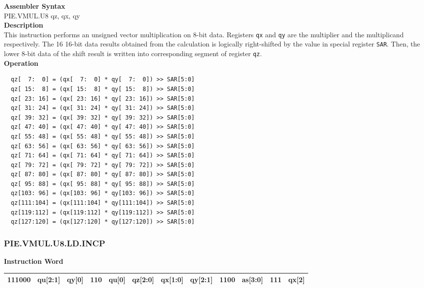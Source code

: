 \textbf{Assembler Syntax} \\
PIE.VMUL.U8 qz, qx, qy \\
\textbf{Description} \\
This instruction performs an unsigned vector multiplication on 8-bit data. Registers \lstinline{qx} and \lstinline{qy} are the multiplier and the multiplicand respectively. The 16 16-bit data results obtained from the calculation is logically right-shifted by the value in special register \lstinline{SAR}. Then, the lower 8-bit data of the shift result is written into corresponding segment of register \lstinline{qz}.\\
\textbf{Operation}
\begin{lstlisting}
  qz[  7:  0] = (qx[  7:  0] * qy[  7:  0]) >> SAR[5:0]
  qz[ 15:  8] = (qx[ 15:  8] * qy[ 15:  8]) >> SAR[5:0]
  qz[ 23: 16] = (qx[ 23: 16] * qy[ 23: 16]) >> SAR[5:0]
  qz[ 31: 24] = (qx[ 31: 24] * qy[ 31: 24]) >> SAR[5:0]
  qz[ 39: 32] = (qx[ 39: 32] * qy[ 39: 32]) >> SAR[5:0]
  qz[ 47: 40] = (qx[ 47: 40] * qy[ 47: 40]) >> SAR[5:0]
  qz[ 55: 48] = (qx[ 55: 48] * qy[ 55: 48]) >> SAR[5:0]
  qz[ 63: 56] = (qx[ 63: 56] * qy[ 63: 56]) >> SAR[5:0]
  qz[ 71: 64] = (qx[ 71: 64] * qy[ 71: 64]) >> SAR[5:0]
  qz[ 79: 72] = (qx[ 79: 72] * qy[ 79: 72]) >> SAR[5:0]
  qz[ 87: 80] = (qx[ 87: 80] * qy[ 87: 80]) >> SAR[5:0]
  qz[ 95: 88] = (qx[ 95: 88] * qy[ 95: 88]) >> SAR[5:0]
  qz[103: 96] = (qx[103: 96] * qy[103: 96]) >> SAR[5:0]
  qz[111:104] = (qx[111:104] * qy[111:104]) >> SAR[5:0]
  qz[119:112] = (qx[119:112] * qy[119:112]) >> SAR[5:0]
  qz[127:120] = (qx[127:120] * qy[127:120]) >> SAR[5:0]
\end{lstlisting}

\newpage
\subsubsection{PIE.VMUL.U8.LD.INCP}\label{instruction:PIEVMULU8LDINCP}
\setlength\tabcolsep{6pt}
\textbf{Instruction Word} \\
\begin{tabular}{|c|c|c|c|c|c|c|c|c|c|c|c|}
	\hline
	111000 & qu[2:1] & qy[0] & 110 & qu[0] & qz[2:0] & qx[1:0] & qy[2:1] & 1100 & as[3:0] & 111 & qx[2] \\
	\hline
\end{tabular}

